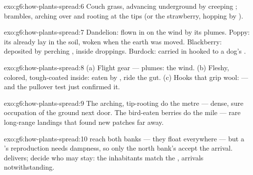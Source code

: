 \begin{solution}{exo:g6:how-plants-spread:6}
Couch grass, advancing underground by creeping ;
brambles, arching over and rooting at the tips (or the
strawberry, hopping by ).
\end{solution}

\begin{solution}{exo:g6:how-plants-spread:7}
Dandelion: flown in on the wind by its plumes. Poppy: its
 already lay in the soil, woken when the earth was
moved. Blackberry: deposited by perching ,  inside
droppings. Burdock: carried in hooked to a dog's .
\end{solution}

\begin{solution}{exo:g6:how-plants-spread:8}
(a) Flight gear --- plumes: the wind. (b) Fleshy, colored,
tough-coated  inside: eaten by ,  ride the
gut. (c) Hooks that grip wool:   --- and the
pullover test just confirmed it.
\end{solution}

\begin{solution}{exo:g6:how-plants-spread:9}
The arching, tip-rooting  do the metre --- dense, sure
occupation of the ground next door. The bird-eaten berries do
the mile --- rare long-range landings that found new patches
far away.
\end{solution}

\begin{solution}{exo:g6:how-plants-spread:10}
 reach both banks --- they float everywhere --- but a
's reproduction needs dampness, so only the north
bank's  accept the arrival.  delivers;
 decide who may stay: the inhabitants match the
, arrivals notwithstanding.
\end{solution}

